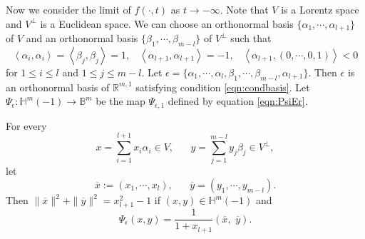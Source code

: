 \documentclass[12pt]{article}
\begin{document}
Now we consider the limit of $f(\cdot, t)$ as $t\rightarrow-\infty$.
Note that $V$ is a Lorentz space and $V^\perp$ is a Euclidean space. We can
choose an orthonormal basis  $\{\alpha_1,\cdots, \alpha_{l+1}\}$ of $V$ and
 an orthonormal basis $\{\beta_{1},\cdots,\beta_{m-l}\}$ of $V^{\perp}$
such that
\[  \left<\alpha_{i},\alpha_{i}\right>=\left<\beta_{j},\beta_{j}\right> = 1, \hspace{10pt}
\left<\alpha_{l+1},\alpha_{l+1}\right>=-1, \hspace{10pt}
\left<\alpha_{l+1}, (0, \cdots, 0, 1) \right> < 0
\]
for $1 \leq i \leq l$ and $1 \leq j \leq m-l$.
Let $\epsilon = \{ \alpha_1, \cdots, \alpha_l, \beta_1, \cdots, \beta_{m-l}, \alpha_{l+1} \}$.
Then $\epsilon$ is an orthonormal basis of $\mathbb{R}^{m,1}$ satisfying condition
\eqref{eqn:condbasis}.
Let $\Psi_\epsilon : \mathbb{H}^{m}(-1) \longrightarrow \mathbb{B}^m$ be
the map $\Psi_{\epsilon, 1}$ defined by equation \eqref{eqn:PsiEr}.


For every
\[  x= \sum_{i=1}^{l+1} x_i \alpha_i \in V, \hspace{20pt}
   y=\sum_{j=1}^{m-l} y_j \beta_j \in V^\perp,\]
let
\[ \overline{x}:=(x_1, \cdots, x_{l}), \hspace{20pt} \overline{y}=(y_1, \cdots, y_{m-l}).\]
 Then
$\|\overline{x}\|^2  + \|\overline{y}\|^2 = x_{l+1}^2 -1$ if $(x, y) \in \mathbb{H}^{m}(-1)$ and
\begin{equation} \label{eqn:psiV}
\Psi_\epsilon (x, y) = \frac{1}{1+x_{l+1}} (\overline{x}, \,\, \overline{y}).
\end{equation}
\end{document}
